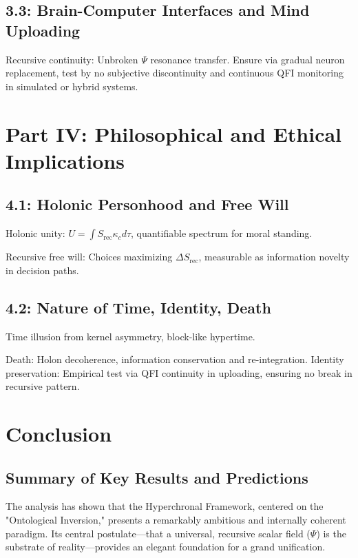 \documentclass[12pt]{article}
\newcommand{\rec}{\mathrm{rec}}  %
\theoremstyle{definition}
\begin{document}
\subsection{3.3: Brain-Computer Interfaces and Mind Uploading}

Recursive continuity: Unbroken $\Psi$ resonance transfer. Ensure via gradual neuron replacement, test by no subjective discontinuity and continuous QFI monitoring in simulated or hybrid systems.

\section{Part IV: Philosophical and Ethical Implications}

\subsection{4.1: Holonic Personhood and Free Will}

Holonic unity: $U = \int S_{\rec} \kappa_c d\tau$, quantifiable spectrum for moral standing.

Recursive free will: Choices maximizing $\Delta S_{\rec}$, measurable as information novelty in decision paths.

\subsection{4.2: Nature of Time, Identity, Death}

Time illusion from kernel asymmetry, block-like hypertime.

Death: Holon decoherence, information conservation and re-integration. Identity preservation: Empirical test via QFI continuity in uploading, ensuring no break in recursive pattern.

\section{Conclusion}

\subsection{Summary of Key Results and Predictions}

The analysis has shown that the Hyperchronal Framework, centered on the "Ontological Inversion," presents a remarkably ambitious and internally coherent paradigm. Its central postulate—that a universal, recursive scalar field ($\Psi$) is the substrate of reality—provides an elegant foundation for a grand unification.
\end{document}
